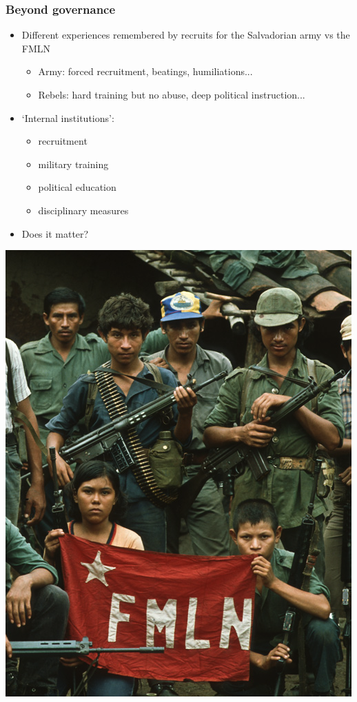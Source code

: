 \documentclass[aspectratio=43]{beamer}
\begin{document}
\begin{frame}
\frametitle{Beyond governance}
\centering

\begin{minipage}{.59\textwidth}\centering
\begin{itemize}
  \item<1-> Different experiences remembered by recruits for the Salvadorian army vs the FMLN
  \begin{itemize}
    \item Army: forced recruitment, beatings, humiliations...
    \item Rebels: hard training but no abuse, deep political instruction...
  \end{itemize}
  \item<2-> `Internal institutions':
  \begin{itemize}
    \item recruitment
    \item military training
    \item political education
    \item disciplinary measures
  \end{itemize}
  \item<3-> Does it matter?
\end{itemize}
\end{minipage}\hfill
\begin{minipage}{.39\textwidth}\centering
\includegraphics[width = \textwidth]{img/fnml_vert}
\end{minipage}

\end{frame}
\end{document}
